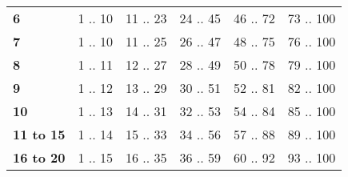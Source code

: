 \documentclass[oneside]{book}
\begin{document}
\begin{table}[h]
\begin{tabular}{lccccc}
\rowcolor[HTML]{FFFFFF} 
\textbf{6}                                 & {\color[HTML]{333333} 1 .. 10}                            & 11 .. 23                           & 24 .. 45                                               & 46 .. 72                                               & 73 .. 100                                              \\
\rowcolor[HTML]{EFEFEF} 
\textbf{7}                                 & {\color[HTML]{333333} 1 .. 10}                            & 11 .. 25                           & 26 .. 47                                               & 48 .. 75                                               & 76 .. 100                                              \\
\rowcolor[HTML]{FFFFFF} 
\textbf{8}                                 & {\color[HTML]{333333} 1 .. 11}                            & 12 .. 27                           & 28 .. 49                                               & 50 .. 78                                               & 79 .. 100                                              \\
\rowcolor[HTML]{EFEFEF} 
\textbf{9}                                 & {\color[HTML]{333333} 1 .. 12}                            & 13 .. 29                           & 30 .. 51                                               & 52 .. 81                                               & 82 .. 100                                              \\
\rowcolor[HTML]{FFFFFF} 
\textbf{10}                                & {\color[HTML]{333333} 1 .. 13}                            & 14 .. 31                           & 32 .. 53                                               & 54 .. 84                                               & 85 .. 100                                              \\
\rowcolor[HTML]{EFEFEF} 
\textbf{11 to 15}                          & {\color[HTML]{333333} 1 .. 14}                            & 15 .. 33                           & 34 .. 56                                               & 57 .. 88                                               & 89 .. 100                                              \\
\rowcolor[HTML]{FFFFFF} 
\textbf{16 to 20}                          & {\color[HTML]{333333} 1 .. 15}                            & 16 .. 35                           & 36 .. 59                                               & 60 .. 92                                               & 93 .. 100                                              \\

\end{tabular}
\end{table}
\end{document}
